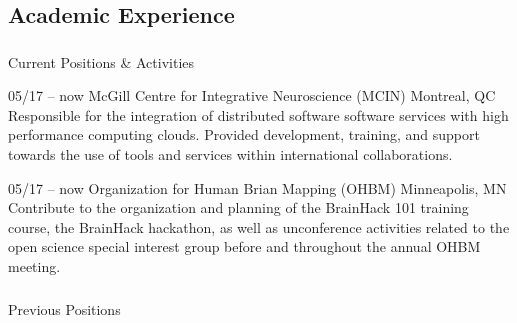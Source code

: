 \documentclass[]{friggeri-cv} %
\begin{document}
\subsection{Academic Experience}

\subsubsection{}{Current Positions \& Activities}

\begin{entrylist}
\entry
{05/17 -- now}
{McGill Centre for Integrative Neuroscience (MCIN)}
{Montreal, QC}
{ \\
Responsible for the integration of distributed software software services with high performance
computing clouds. Provided development, training, and support towards the use of tools and services
within international collaborations.}


\entry
{05/17 -- now}
{Organization for Human Brian Mapping (OHBM)}
{Minneapolis, MN}
{ \\
Contribute to the organization and planning of the BrainHack 101 training course, the BrainHack hackathon,
as well as unconference activities related to the open science special interest group before and throughout
the annual OHBM meeting.}
\end{entrylist}

\subsubsection{}{Previous Positions}
\end{document}
